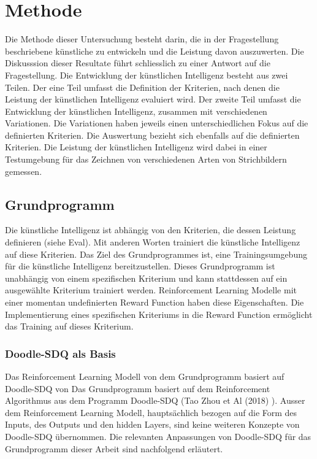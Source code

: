 \chapter{Methode}
Die Methode dieser Untersuchung besteht darin, die in der Fragestellung
beschriebene künstliche zu entwickeln und die Leistung davon auszuwerten. Die
Diskusssion dieser Resultate führt schliesslich zu einer Antwort auf die
Fragestellung. 
Die Entwicklung der künstlichen Intelligenz besteht aus zwei Teilen. Der eine
Teil umfasst die Definition der Kriterien, nach denen die Leistung der
künstlichen Intelligenz evaluiert wird. Der zweite Teil umfasst die Entwicklung
der künstlichen Intelligenz, zusammen mit verschiedenen Variationen. Die
Variationen haben jeweils einen unterschiedlichen Fokus auf die definierten
Kriterien. Die Auswertung bezieht sich ebenfalls auf die definierten Kriterien.
Die Leistung der künstlichen Intelligenz wird dabei in einer Testumgebung für
das Zeichnen von verschiedenen Arten von Strichbildern gemessen.

\section{Grundprogramm}
\label{chap:m_grundprogramm}
Die künstliche Intelligenz ist abhängig von den Kriterien, die dessen Leistung
definieren (siehe Eval). Mit anderen Worten trainiert die künstliche Intelligenz
auf diese Kriterien. Das Ziel des Grundprogrammes ist, eine Trainingsumgebung
für die künstliche Intelligenz bereitzustellen. Dieses Grundprogramm ist
unabhängig von einem spezifischen Kriterium und kann stattdessen auf ein
ausgewählte Kriterium trainiert werden. Reinforcement Learning Modelle mit einer
momentan undefinierten Reward Function haben diese Eigenschaften. Die
Implementierung eines spezifischen Kriteriums in die Reward Function ermöglicht
das Training auf dieses Kriterium. 

\subsection{Doodle-SDQ als Basis}
Das Reinforcement Learning Modell von dem Grundprogramm basiert auf Doodle-SDQ
von Das Grundprogramm basiert auf dem Reinforcement Algorithmus aus dem Programm
Doodle-SDQ (Tao Zhou et Al (2018) \cite{zhou_learning_2018}). Ausser dem
Reinforcement Learning Modell, hauptsächlich bezogen auf die Form des Inputs,
des Outputs und den hidden Layers, sind keine weiteren Konzepte von Doodle-SDQ
übernommen. Die relevanten Anpassungen von Doodle-SDQ für das Grundprogramm
dieser Arbeit sind nachfolgend erläutert.

